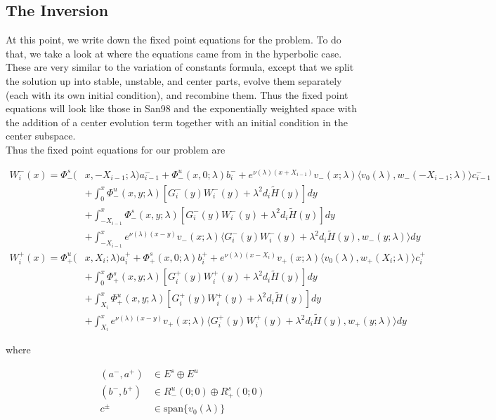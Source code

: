 \documentclass[12pt]{article}
\begin{document}
\subsection{The Inversion}

At this point, we write down the fixed point equations for the problem. To do that, we take a look at where the equations came from in the hyperbolic case. These are very similar to the variation of constants formula, except that we split the solution up into stable, unstable, and center parts, evolve them separately (each with its own initial condition), and recombine them. Thus the fixed point equations will look like those in San98 and the exponentially weighted space with the addition of a center evolution term together with an initial condition in the center subspace.\\ 

Thus the fixed point equations for our problem are

\begin{align*}
W_i^-(x) = \Phi^s_-(&x, -X_{i-1}; \lambda)a_{i-1}^- + \Phi^u_-(x, 0; \lambda)b_i^- + e^{\nu(\lambda)(x+X_{i-1})} v_-(x; \lambda) \langle v_0(\lambda), w_-(-X_{i-1}; \lambda) \rangle c_{i-1}^- \\
&+ \int_0^x \Phi^u_-(x, y; \lambda)[ G_i^-(y)W_i^-(y) + \lambda^2 d_i \tilde{H}(y) ] dy \\
&+ \int_{-X_{i-1}}^x \Phi^s_-(x, y; \lambda) [ G_i^-(y)W_i^-(y) + \lambda^2 d_i \tilde{H}(y) ] dy \\
&+ \int_{-X_{i-1}}^x 
e^{\nu(\lambda)(x-y)} v_-(x; \lambda) \langle G_i^-(y)W_i^-(y) + \lambda^2 d_i \tilde{H}(y), w_-(y; \lambda) \rangle dy \\
W_i^+(x) = \Phi^u_+(&x, X_i; \lambda)a_i^+ + \Phi^s_+(x, 0; \lambda)b_i^+ + e^{\nu(\lambda)(x - X_i)} v_+(x; \lambda) \langle v_0(\lambda), w_+(X_i; \lambda) \rangle c_i^+ \\
&+ \int_0^x \Phi^s_+(x, y; \lambda) [ G_i^+(y)W_i^+(y) + \lambda^2 d_i \tilde{H}(y) ] dy \\
&+ \int_{X_i}^x \Phi^u_+(x, y; \lambda) [ G_i^+(y)W_i^+(y) + \lambda^2 d_i \tilde{H}(y) ] dy \\
&+ \int_{X_i}^x e^{\nu(\lambda)(x-y)} v_+(x; \lambda) \langle G_i^+(y)W_i^+(y) + \lambda^2 d_i \tilde{H}(y), w_+(y; \lambda) \rangle dy
\end{align*}

where

\begin{align*}
(a^-, a^+) &\in E^s \oplus E^u\\
(b^-, b^+) &\in R^u_-(0; 0) \oplus R^s_+(0; 0)\\
c^\pm &\in \text{span}\{v_0(\lambda)\}
\end{align*}
\end{document}

